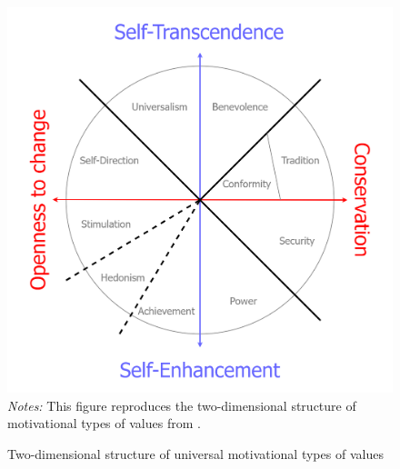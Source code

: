 \begin{figure}[!htb]
    \caption{Two-dimensional structure of universal motivational types of values}
    \label{chap3-fig:schwartz}
    \centering
    \includegraphics[width=.8\linewidth]{chap3/graphic/schwartz92.png}
	\vspace{-3em}
	\justify\singlespacing\footnotesize{\textit{Notes:} This figure reproduces the two-dimensional structure of motivational types of values from \citet{Schwartz1992Universals, Schwartz2012Overview}.}
\end{figure}
